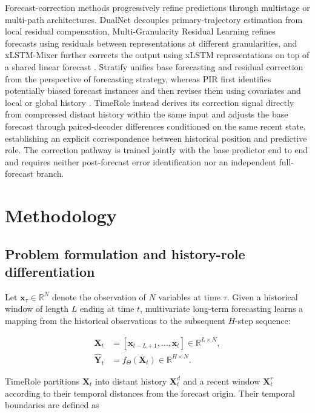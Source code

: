 Forecast-correction methods progressively refine predictions through multistage or multi-path architectures. DualNet decouples primary-trajectory estimation from local residual compensation, Multi-Granularity Residual Learning refines forecasts using residuals between representations at different granularities, and xLSTM-Mixer further corrects the output using xLSTM representations on top of a shared linear forecast \citep{Li2025DualNet,Hou2022MRLF,Kraus2025xLSTMMixer}. Stratify unifies base forecasting and residual correction from the perspective of forecasting strategy, whereas PIR first identifies potentially biased forecast instances and then revises them using covariates and local or global history \citep{Green2025Stratify,Liu2025PIR}. TimeRole instead derives its correction signal directly from compressed distant history within the same input and adjusts the base forecast through paired-decoder differences conditioned on the same recent state, establishing an explicit correspondence between historical position and predictive role. The correction pathway is trained jointly with the base predictor end to end and requires neither post-forecast error identification nor an independent full-forecast branch.

\section{Methodology}

\subsection{Problem formulation and history-role differentiation}

Let \(\mathbf{x}_{\tau}\in\mathbb{R}^{N}\) denote the observation of \(N\) variables at time \(\tau\). Given a historical window of length \(L\) ending at time \(t\), multivariate long-term forecasting learns a mapping from the historical observations to the subsequent \(H\)-step sequence:

\begin{equation}
\begin{aligned}
\mathbf{X}_{t}
&=[\mathbf{x}_{t-L+1},\ldots,\mathbf{x}_{t}]
\in\mathbb{R}^{L\times N},\\
\widehat{\mathbf{Y}}_{t}
&=f_{\Theta}(\mathbf{X}_{t})
\in\mathbb{R}^{H\times N}.
\end{aligned}
\label{eq:forecasting-task}
\end{equation}

TimeRole partitions \(\mathbf{X}_{t}\) into distant history \(\mathbf{X}^{d}_{t}\) and a recent window \(\mathbf{X}^{r}_{t}\) according to their temporal distances from the forecast origin. Their temporal boundaries are defined as

